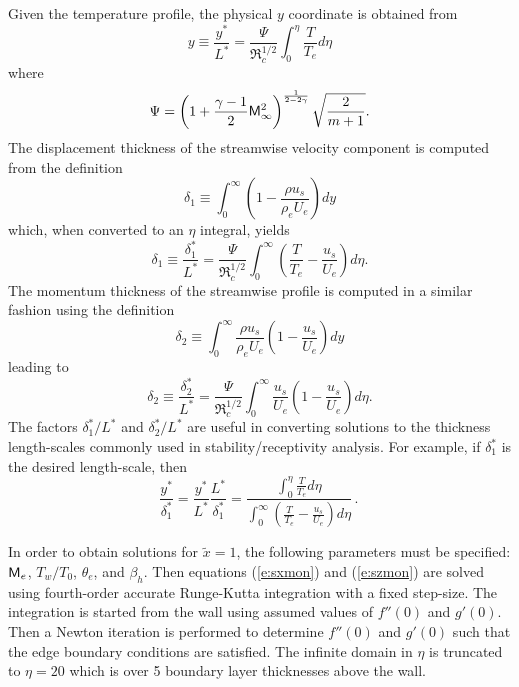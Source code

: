 Given the temperature profile, the physical $y$ coordinate is obtained from
%
\begin{equation}
  y \equiv \frac{y^*}{L^*} = 
  	\frac{\Psi}{\Re_c^{1/2}}\int_0^\eta \frac{T}{T_e} d\eta 
\end{equation}
%
where
%
\begin{equation}
  \Psi = \left( 1 + \frac{\gamma-1}{2} {\sf M}_\infty^2 \right)^
         {\frac{1}{2 - 2\gamma}}
         \sqrt{\frac{2}{m+1}} .
\end{equation}
%
The displacement thickness of the streamwise velocity component is computed
from the definition
%
\begin{equation}
  \delta_1 \equiv 
  \int_0^\infty \left( 1 - \frac{\rho u_s}{\rho_e U_e} \right) dy
\end{equation}
%
which, when converted to an $\eta$ integral, yields
%
\begin{equation}
  \delta_1 \equiv \frac{\delta^*_1}{L^*} =
	\frac{\Psi}{\Re_c^{1/2}} \int_0^\infty \left( \frac{T}{T_e} - 
        \frac{u_s}{U_e} \right) d\eta .
\end{equation}
%
The momentum thickness of the streamwise profile is computed in a similar
fashion using the definition
%
\begin{equation}
  \delta_2 \equiv \int_0^\infty \frac{\rho u_s}{\rho_e U_e}
                  \left( 1 - \frac{u_s}{U_e} \right) dy 
\end{equation}
%
leading to
%
\begin{equation}
  \delta_2 \equiv \frac{\delta^*_2}{L^*} = 
  	\frac{\Psi}{\Re_c^{1/2}} \int_0^\infty \frac{u_s}{U_e}
        \left( 1 - \frac{u_s}{U_e} \right) d\eta .
\end{equation}
%
The factors $\delta^*_1/L^*$ and $\delta_2^*/L^*$ are useful in converting
solutions to the thickness length-scales commonly used in
stability/receptivity analysis.  For example, if $\delta^*_1$ is the desired
length-scale, then
%
\begin{equation}
  \frac{y^*}{\delta^*_1} = \frac{y^*}{L^*} \frac{L^*}{\delta^*_1} =
  \frac{\int_0^\eta \frac{T}{T_e} d\eta}
                                {\int_0^\infty \left( \frac{T}{T_e} - 
        			 \frac{u_s}{U_e} \right) d\eta} \period
\end{equation}

In order to obtain solutions for $\tilde x = 1$, the following parameters must
be specified: ${\sf M}_e$, $T_w/T_0$, $\theta_e$, and $\beta_h$.  Then equations
(\ref{e:sxmon}) and (\ref{e:szmon}) are solved using fourth-order accurate
Runge-Kutta integration with a fixed step-size.  The integration is started
from the wall using assumed values of $f''(0)$ and $g'(0)$.  Then a Newton
iteration is performed to determine $f''(0)$ and $g'(0)$ such that the edge
boundary conditions are satisfied.  The infinite domain in $\eta$ is truncated
to $\eta=20$ which is over 5 boundary layer thicknesses above the wall.


